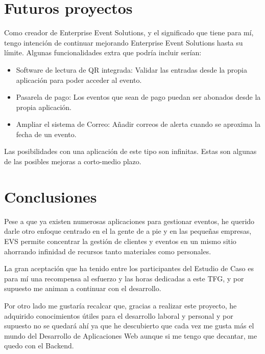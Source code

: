 
\section{Futuros proyectos}
Como creador de Enterprise Event Solutions, y el significado que tiene para mí, tengo intención de continuar mejorando Enterprise Event Solutions hasta
su límite. Algunas funcionalidades extra que podría incluir serían:
\begin{itemize}
    \item Software de lectura de QR integrada: Validar las entradas desde la propia aplicación para poder acceder al evento.
    \item Pasarela de pago: Los eventos que sean de pago puedan ser abonados desde la propia aplicación. 
    \item Ampliar el sistema de Correo: Añadir correos de alerta cuando se aproxima la fecha de un evento.
\end{itemize}

Las posibilidades con una aplicación de este tipo son infinitas. Estas son algunas de las posibles mejoras a corto-medio plazo. 

\section{Conclusiones}
Pese a que ya existen numerosas aplicaciones para gestionar eventos, he querido darle otro enfoque centrado en el la gente de a pie y en las pequeñas empresas,
EVS permite concentrar la gestión de clientes y eventos en un mismo sitio ahorrando infinidad de recursos tanto materiales como personales. 

La gran aceptación que ha tenido entre los participantes del Estudio de Caso es para mí una recompensa al esfuerzo y las horas dedicadas a este TFG, y por supuesto
me animan a continuar con el desarrollo.

Por otro lado me gustaría recalcar que, gracias a realizar este proyecto, he adquirido conocimientos útiles para el desarrollo laboral y personal y por 
supuesto no se quedará ahí ya que he descubierto que cada vez me gusta más el mundo del Desarrollo de Aplicaciones Web aunque si me tengo que decantar, me quedo con
el Backend.


